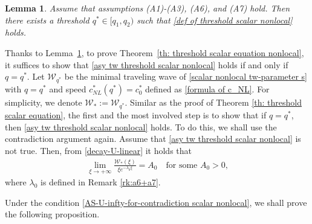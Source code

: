 \documentclass[11pt,a4paper]{article}
\newtheorem{lemma}[theorem]{\textbf{Lemma}}
\numberwithin{equation}{section}
\numberwithin{figure}{section}
\newcommand\bea{\begin{eqnarray}}
\newcommand\eea{\end{eqnarray}}
\begin{document}
\begin{lemma}\label{lem: th1-part1 nonlocal}
Assume that assumptions (A1)-(A3), (A6), and (A7) hold. Then there exists a threshold $q^*\in[q_1,q_2)$ such that \eqref{def of threshold scalar nonlocal} holds.
\end{lemma}



Thanks to Lemma~\ref{lem: th1-part1 nonlocal}, to prove Theorem~\ref{th: threshold scalar equation nonlocal}, it suffices to show that
\eqref{asy tw threshold scalar nonlocal} holds if and only if $q=q^*$.
Let $\mathcal{W}_{q^*}$ be the minimal traveling wave of \eqref{scalar nonlocal tw-parameter s} with $q=q^*$
and %
speed $c_{NL}^*(q^*)=c_0^*$ defined as \eqref{formula of c_NL}. For simplicity, we denote $\mathcal{W}_*:=\mathcal{W}_{q^*}$.
Similar as the proof of Theorem \ref{th: threshold scalar equation}, the first and the most involved step is to show that if $q=q^*$, then \eqref{asy tw threshold scalar nonlocal} holds.
To do this, we shall use the contradiction argument again.
Assume that \eqref{asy tw threshold scalar nonlocal} is not true. Then, from \eqref{decay-U-linear}  %
it holds that
\bea\label{AS-U-infty-for-contradiction scalar nonlocal}
\lim_{\xi\rightarrow+\infty}\frac{\mathcal{W}_{*}(\xi)}{\xi e^{-\lambda_0\xi}}=A_0\quad \mbox{for some $A_0>0$,}
\eea
where $\lambda_0$ is defined in Remark \ref{rk:a6+a7}.

Under the condition \eqref{AS-U-infty-for-contradiction scalar nonlocal},
we shall prove the following proposition.
\end{document}
